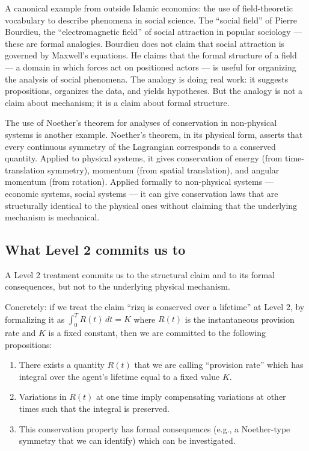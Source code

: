 A canonical example from outside Islamic economics: the use of
field-theoretic vocabulary to describe phenomena in social science.
The ``social field'' of Pierre Bourdieu, the ``electromagnetic field''
of social attraction in popular sociology --- these are formal
analogies. Bourdieu does not claim that social attraction is governed
by Maxwell's equations. He claims that the formal structure of a
field --- a domain in which forces act on positioned actors --- is
useful for organizing the analysis of social phenomena. The analogy
is doing real work: it suggests propositions, organizes the data,
and yields hypotheses. But the analogy is not a claim about
mechanism; it is a claim about formal structure.

The use of Noether's theorem for analyses of conservation in non-physical
systems is another example. Noether's theorem, in its physical form,
asserts that every continuous symmetry of the Lagrangian corresponds
to a conserved quantity. Applied to physical systems, it gives
conservation of energy (from time-translation symmetry), momentum
(from spatial translation), and angular momentum (from rotation).
Applied formally to non-physical systems --- economic systems, social
systems --- it can give conservation laws that are structurally
identical to the physical ones without claiming that the underlying
mechanism is mechanical.

\subsection{What Level 2 commits us to}

A Level 2 treatment commits us to the structural claim and to its
formal consequences, but not to the underlying physical mechanism.

Concretely: if we treat the claim ``rizq is conserved over a
lifetime'' at Level 2, by formalizing it as $\int_0^T R(t)\,dt = K$
where $R(t)$ is the instantaneous provision rate and $K$ is a
fixed constant, then we are committed to the following propositions:

\begin{enumerate}[leftmargin=2em]
    \item There exists a quantity $R(t)$ that we are calling
    ``provision rate'' which has integral over the agent's lifetime
    equal to a fixed value $K$.
    \item Variations in $R(t)$ at one time imply compensating
    variations at other times such that the integral is preserved.
    \item This conservation property has formal consequences (e.g.,
    a Noether-type symmetry that we can identify) which can be
    investigated.
\end{enumerate}

